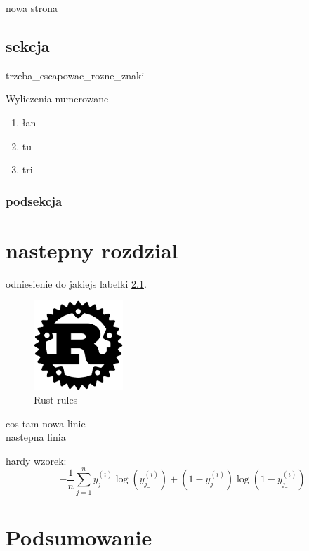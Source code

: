 \documentclass[12pt, notitlepage]{report}
\begin{document}
\newpage
nowa strona

    \section{sekcja}
        trzeba\_escapowac\_rozne\_znaki

        Wyliczenia numerowane
        \begin{enumerate}
            \item łan
            \item tu
            \item tri           
        \end{enumerate}

        \subsection{podsekcja}

\chapter{nastepny rozdzial}
    odniesienie do jakiejs labelki \ref{fig:rust}.
        
    \begin{figure}[H] %
        \centering
        \includegraphics[width=0.3\textwidth]{rust.png}
        \caption{Rust rules}
        \label{fig:rust}
    \end{figure}

    cos tam
\newline
nowa linie \\
nastepna linia

hardy wzorek: $$-\frac{1}{n}\sum_{j=1}^{n}y_j^{(i)}\log(y_{j\_}^{(i)}) + (1  - y_j^{(i)})\log(1 - y_{j\_}^{(i)})$$

\chapter*{Podsumowanie}
\end{document}
